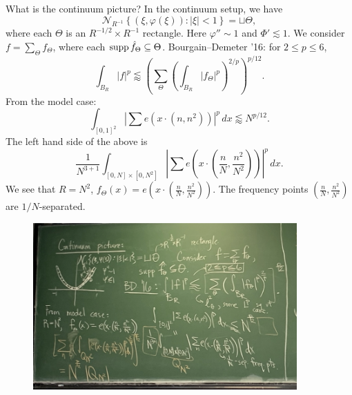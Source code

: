 \documentclass[reqno]{amsart} 
\numberwithin{theorem}{section}
\numberwithin{equation}{section}
\begin{document}
What is the continuum picture?  In the continuum setup, we have
\begin{equation*}
  \mathcal{N}_{R^{-1}} \left\{  (\xi, \varphi(\xi)) : \lvert \xi \rvert < 1 \right\}
  =
  \sqcup \Theta,
\end{equation*}
where each $\Theta$ is an $R^{-1/2} \times R^{-1}$ rectangle.  Here $\varphi '' \sim 1$ and $\Phi ' \lesssim 1$.  We consider $f = \sum_{\Theta } f_\Theta$, where each $\operatorname{supp} \hat{f}_\Theta \subseteq \Theta$.  Bourgain--Demeter '16: for $2 \leq p \leq 6$,
\begin{equation*}
  \int_{B_R} \lvert f \rvert^p \lessapprox \left( \sum_{\Theta}
    \left( \int_{B_R} \lvert f_\Theta \rvert^p \right)^{2/p}\right)^{p/12}.
\end{equation*}
From the model case:
\begin{equation*}
  \int_{[0, 1]^2}
  \left\lvert \sum e(x \cdot(n, n^2)) \right\rvert^p \, d x
  \lessapprox N^{p/12}.
\end{equation*}
The left hand side of the above is
\begin{equation*}
  \frac{1}{N^{3+1}} \int_{[0, N] \times[0, N^2]}
  \left\lvert
    \sum e \left( x \cdot \left( \frac{n}{N}, \frac{n^2}{N^2} \right) \right)\right\rvert^p \, d x.
\end{equation*}
We see that $R = N^2$, $f_\Theta(x) = e \left( x \cdot \left( \frac{n}{N}, \frac{n^2}{N^2} \right) \right)$.  The frequency points $(\tfrac{n}{N}, \tfrac{n^2}{N^2})$ are $1/N$-separated.

\begin{figure}
  \centering
  \includegraphics[width=0.9\textwidth]{images/img_20250428_151924}
\end{figure}
\end{document}
